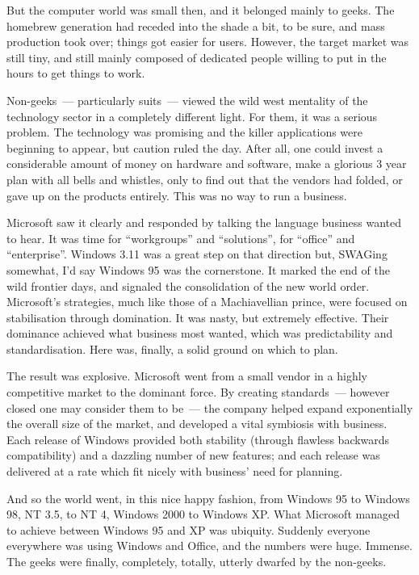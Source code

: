 \documentclass{book}
\begin{document}
But the computer world was small then, and it belonged mainly to
geeks. The homebrew generation had receded into the shade a bit, to be
sure, and mass production took over; things got easier for
users. However, the target market was still tiny, and still mainly
composed of dedicated people willing to put in the hours to get things
to work.

Non-geeks~--- particularly suits~--- viewed the wild west mentality of
the technology sector in a completely different light. For them, it
was a serious problem. The technology was promising and the killer
applications were beginning to appear, but caution ruled the
day. After all, one could invest a considerable amount of money on
hardware and software, make a glorious 3 year plan with all bells and
whistles, only to find out that the vendors had folded, or gave up on
the products entirely. This was no way to run a business.

Microsoft saw it clearly and responded by talking the language
business wanted to hear. It was time for ``workgroups'' and ``solutions'',
for ``office'' and ``enterprise''. Windows 3.11 was a great step on that
direction but, SWAGing somewhat, I'd say Windows 95 was the
cornerstone. It marked the end of the wild frontier days, and signaled
the consolidation of the new world order. Microsoft's strategies, much
like those of a Machiavellian prince, were focused on stabilisation
through domination. It was nasty, but extremely effective. Their
dominance achieved what business most wanted, which was predictability
and standardisation. Here was, finally, a solid ground on which to
plan.

The result was explosive. Microsoft went from a small vendor in a
highly competitive market to the dominant force. By creating
standards~--- however closed one may consider them to be~--- the
company helped expand exponentially the overall size of the market,
and developed a vital symbiosis with business. Each release of Windows
provided both stability (through flawless backwards compatibility) and
a dazzling number of new features; and each release was delivered at a
rate which fit nicely with business' need for planning.

And so the world went, in this nice happy fashion, from Windows 95 to
Windows 98, NT 3.5, to NT 4, Windows 2000 to Windows XP. What
Microsoft managed to achieve between Windows 95 and XP was
ubiquity. Suddenly everyone everywhere was using Windows and Office,
and the numbers were huge. Immense. The geeks were finally,
completely, totally, utterly dwarfed by the non-geeks.
\end{document}
